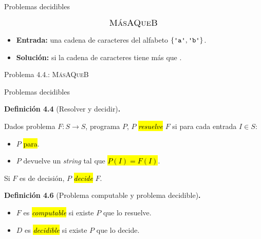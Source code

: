 \documentclass[10pt,xcolor=dvipsnames,aspectratio=169,spanish]{beamer}
\makeatletter
\let\HL\hl
\renewcommand\hl{%
  \let\set@color\beamerorig@set@color
  \let\reset@color\beamerorig@reset@color
  \HL}
\newcommand{\hle}[1]{\hl{\emph{#1}}}
\newcommand{\palabra}[1]{\texttt{\textquotesingle{}{#1}\textquotesingle{}}}
\makeatother
\begin{document}
\begin{frame}{Problemas decidibles}

\begin{framed}
$$\text{\large \textsc{MásAQueB}}$$

\begin{itemize}
    \item \textbf{Entrada:} una cadena de caracteres del alfabeto $\{\palabra{a}, \palabra{b}\}$.
    \item \textbf{Solución:} si la cadena de caracteres tiene más \palabra{a} que \palabra{b}.
\end{itemize}
\end{framed}
\begin{center}
{\small Problema 4.4.: \textsc{MásAQueB}}
\end{center}

\end{frame}


\begin{frame}{Problemas decidibles}

\textbf{Definición 4.4} (Resolver y decidir)\textbf{.}

Dados problema $F:S\longrightarrow S$, programa $P$, $P$ \hle{resuelve} $F$ si para cada entrada $I\in S$:

\begin{itemize}
    \item $P$ \hl{para}.
    \item $P$ devuelve un \emph{string} tal que \hl{$P(I)=F(I)$}.
\end{itemize}

Si $F$ es de decisión, $P$ \hle{decide} $F$.

\vspace{5mm}

\pause

\textbf{Definición 4.6} (Problema computable y problema decidible)\textbf{.}

\begin{itemize}
    \item $F$ es \hle{computable} si existe $P$ que lo resuelve.
    \item $D$ es \hle{decidible} si existe $P$ que lo decide.
\end{itemize}


\end{frame}
\end{document}
